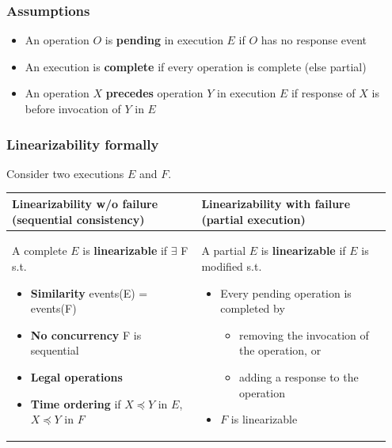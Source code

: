 \subsubsection{Assumptions}
\begin{itemize}
    \item An operation $O$ is \textbf{pending} in execution $E$ if $O$ has no
    response event
    \item An execution is \textbf{complete} if every operation is complete
    (else partial)
    \item An operation $X$ \textbf{precedes} operation $Y$ in execution $E$ if
    response of $X$ is before invocation of $Y$ in $E$
    \end{itemize}

\subsubsection{Linearizability formally}

Consider two executions $E$ and $F$.

\begin{table}[!ht]
    \begin{tabular}{p{0.475\linewidth}|p{0.475\linewidth}}
        Linearizability w/o failure (sequential consistency) & Linearizability with failure (partial execution) \\
        \hline
        A complete $E$ is \textbf{linearizable} if $\exists$ F s.t.
        \begin{itemize}
            \item \textbf{Similarity} events(E) = events(F)
            \item \textbf{No concurrency} F is sequential
            \item \textbf{Legal operations}
            \item \textbf{Time ordering} if $X \preceq Y$ in $E$, $X \preceq Y$ in $F$
        \end{itemize} & A partial $E$ is \textbf{linearizable} if $E$ is modified s.t.
        \begin{itemize}
            \item Every pending operation is completed by
            \begin{itemize}
                \item removing the invocation of the operation, or
                \item adding a response to the operation
            \end{itemize}
            \item $F$ is linearizable
        \end{itemize} \\
    \end{tabular}
\end{table}
\FloatBarrier{}
